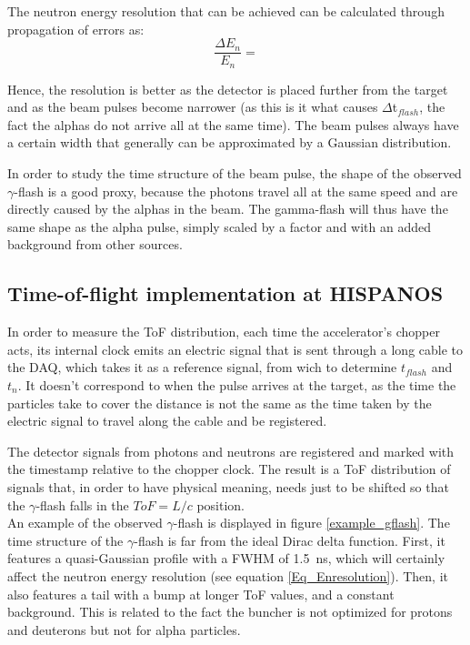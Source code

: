 \documentclass[a4paper,12pt]{report}
\begin{document}
The neutron energy resolution that can be achieved can be calculated through propagation of errors as:
\begin{equation}
    \frac{\Delta E_n}{E_n} =
    \label{Eq_Enresolution}
\end{equation}

Hence, the resolution is better as the detector is placed further from the target and as the beam pulses become narrower (as this is it what causes  $\Delta$t$_{flash}$, the fact the alphas do not arrive all at the same time).
The beam pulses always have a certain width that generally can be approximated by a Gaussian distribution.

In order to study the time structure of the beam pulse, the shape of the observed $\gamma$-flash is a good proxy, because the photons travel all at the same speed and are directly caused by the alphas in the beam.
The gamma-flash will thus have the same shape as the alpha pulse, simply scaled by a factor and with an added background from other sources.

\subsection{Time-of-flight implementation at HISPANOS} 
In order to measure the ToF distribution, each time the accelerator's chopper acts, its internal clock emits an electric signal that is sent through a long cable to the DAQ, which takes it as a reference signal, from wich to determine $t_{flash}$ and $t_n$.
It doesn't correspond to when the pulse arrives at the target, as the time the particles take to cover the distance is not the same as the time taken by the electric signal to travel along the cable and be registered.

The detector signals from photons and neutrons are registered and marked with the timestamp relative to the chopper clock.
The result is a ToF distribution of signals that, in order to have physical meaning, needs just to be shifted so that the $\gamma$-flash falls in the $ToF=L/c$ position.
\\

An example of the observed $\gamma$-flash is displayed in figure \ref{example_gflash}.	%
The time structure of the $\gamma$-flash is far from the ideal Dirac delta function.
First, it features a quasi-Gaussian profile with a FWHM of \qty{1.5}{\nano\second}, which will certainly affect the neutron energy resolution (see equation \ref{Eq_Enresolution}).
Then, it also features a tail with a bump at longer ToF values, and a constant background.
This is related to the fact the buncher is not optimized for protons and deuterons but not for alpha particles.
\end{document}
